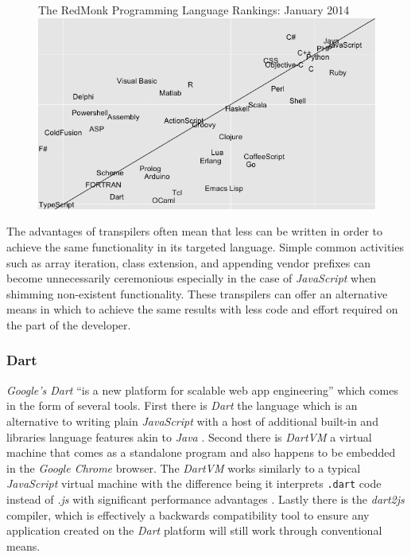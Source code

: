 \documentclass[final]{cmpreport}
\begin{document}
\begin{figure}[h]{The RedMonk Programming Language Rankings: January 2014 \label{ranking}}
  \includegraphics[width=1.0\textwidth]{lang-rank-114-wm.png}
\end{figure}

The advantages of transpilers often mean that less can be written in order to achieve the same functionality in its targeted language. Simple common activities such as array iteration, class extension, and appending vendor prefixes can become unnecessarily ceremonious especially in the case of \textit{JavaScript} when shimming non-existent functionality. These transpilers can offer an alternative means in which to achieve the same results with less code and effort required on the part of the developer.
\subsubsection{Dart}
\textit{Google's Dart} ``is a new platform for scalable web app engineering'' which comes in the form of several tools. First there is \textit{Dart} the language which is an alternative to writing plain \textit{JavaScript} with a host of additional built-in and libraries language features akin to \textit{Java} \cite{Fortuna}. Second there is \textit{DartVM} a virtual machine that comes as a standalone program and also happens to be embedded in the \textit{Google Chrome} browser. The \textit{DartVM} works similarly to a typical \textit{JavaScript} virtual machine with the difference being it interprets \texttt{.dart} code instead of \textit{.js} with significant performance advantages \cite{Schneider}. Lastly there is the \textit{dart2js} compiler, which is effectively a backwards compatibility tool to ensure any application created on the \textit{Dart} platform will still work through conventional means.
\end{document}

